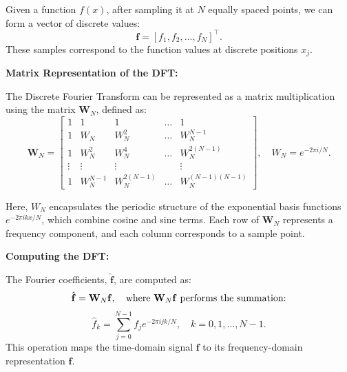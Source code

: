 \documentclass{article}
\begin{document}
\begin{itemize}
{Given a function \( f(x) \), after sampling it at \( N \) equally spaced points, we can form a vector of discrete values:
\[ \mathbf{f} = [f_1, f_2, \dots, f_N]^\top. \]
These samples correspond to the function values at discrete positions \( x_j \).

\textbf{Matrix Representation of the DFT:}

The Discrete Fourier Transform can be represented as a matrix multiplication using the matrix \( \mathbf{W}_N \), defined as:
\[ \mathbf{W}_{N} = \begin{bmatrix}
1 & 1 & 1 & \dots & 1 \\
1 & W_N & W_N^2 & \dots & W_N^{N-1} \\
1 & W_N^2 & W_N^4 & \dots & W_N^{2(N-1)} \\
\vdots & \vdots & \vdots & & \vdots \\
1 & W_N^{N-1} & W_N^{2(N-1)} & \dots & W_N^{(N-1)(N-1)}
\end{bmatrix}, \quad W_N = e^{-2\pi i / N}. \]

Here, \( W_N \) encapsulates the periodic structure of the exponential basis functions \( e^{-2\pi i k x / N} \), which combine cosine and sine terms.
Each row of \( \mathbf{W}_N \) represents a frequency component, and each column corresponds to a sample point.

\textbf{Computing the DFT:}

The Fourier coefficients, \( \hat{\mathbf{f}} \), are computed as:
\[ \hat{\mathbf{f}} = \mathbf{W}_N \mathbf{f}, \quad \text{where \( \mathbf{W}_N \mathbf{f} \) performs the summation:} \]
\[ \hat{f}_k = \sum_{j=0}^{N-1} f_j e^{-2\pi i j k / N}, \quad k = 0, 1, \dots, N-1. \]
This operation maps the time-domain signal \( \mathbf{f} \) to its frequency-domain representation \( \hat{\mathbf{f}} \).

}
\end{itemize}
\end{document}
